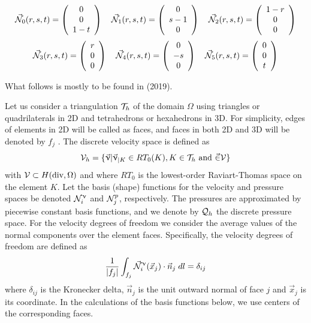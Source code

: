 \[
\vec{{\mathcal{N}}}_0(r,s,t) = \left( \begin{array}{c} 0\\0\\1-t  \end{array} \right) 
\quad
\vec{{\mathcal{N}}}_1(r,s,t) = \left( \begin{array}{c} 0\\s-1\\0  \end{array} \right) 
\quad
\vec{{\mathcal{N}}}_2(r,s,t) = \left( \begin{array}{c} 1-r\\0 \\0  \end{array} \right) 
\]
\[
\vec{{\mathcal{N}}}_3(r,s,t) = \left( \begin{array}{c} r\\0\\0  \end{array} \right) 
\quad
\vec{{\mathcal{N}}}_4(r,s,t) = \left( \begin{array}{c} 0\\-s\\0  \end{array} \right) 
\quad
\vec{{\mathcal{N}}}_5(r,s,t) = \left( \begin{array}{c} 0\\0\\t  \end{array} \right) 
\]



\newpage
What follows is mostly to be found in \textcite{weso19} (2019).

Let us consider a triangulation ${\cal T}_h$ of the domain $\Omega$ 
using triangles or quadrilaterals in 2D and tetrahedrons or
hexahedrons in 3D. For simplicity, edges of elements in 2D will be called as faces, 
and faces in both 2D and 3D will be denoted by $f_j$ . The discrete velocity space is defined as 
\cite{ergu21_72}
\[
{\cal V}_h = \{ \vec{\upnu} | \vec{\upnu}_{|K}  \in RT_0(K) , K\in {\cal T}_h \text{ and } \vec\in {\cal V} \}
\]
with ${\cal V} \subset H(\text{div},\Omega)$ and
where $RT_0$ is the lowest-order Raviart-Thomas space on the element $K$. 
Let the basis (shape) functions for the velocity and pressure spaces be denoted ${\mathcal{N}}^\upnu_i$ and 
${\mathcal{N}}^p_j$, respectively. The pressures are approximated by piecewise
constant basis functions, and we denote by ${\cal Q}_h$ the discrete pressure space. For the velocity degrees of freedom we
consider the average values of the normal components over the element faces. Specifically, the velocity degrees of
freedom are defined as
\begin{equation}
\frac{1}{|f_j|} \int_{f_j} \vec{{\mathcal{N}}}^\upnu_i( \vec{x}_j) \cdot \vec{n}_j \; dl = \delta_{ij} 
\label{eq:RTbfdef}
\end{equation}
where $\delta_{ij}$ is the Kronecker delta, $\vec{n}_j$ is the unit outward normal of face $j$ 
and $\vec{x}_j$ is its coordinate. In the calculations
of the basis functions below, we use centers of the corresponding faces.

